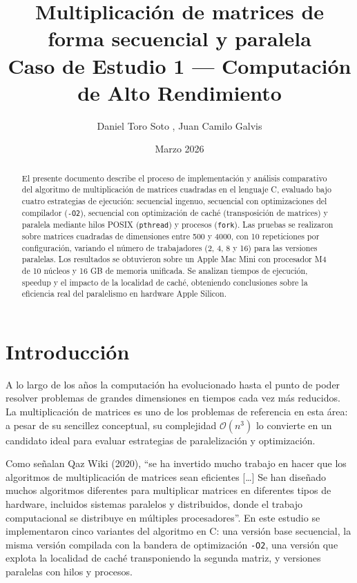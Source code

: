 \documentclass{article}
\title{Multiplicación de matrices de forma secuencial y paralela\\[0.5em]
\large Caso de Estudio 1 --- Computación de Alto Rendimiento}
\author{Daniel Toro Soto , Juan Camilo Galvis}
\date{Marzo 2026}
\begin{document}
\maketitle

\begin{abstract}
El presente documento describe el proceso de implementación y análisis comparativo del algoritmo de multiplicación de matrices cuadradas en el lenguaje C, evaluado bajo cuatro estrategias de ejecución: secuencial ingenuo, secuencial con optimizaciones del compilador (\texttt{-O2}), secuencial con optimización de caché (transposición de matrices) y paralela mediante hilos POSIX (\texttt{pthread}) y procesos (\texttt{fork}). Las pruebas se realizaron sobre matrices cuadradas de dimensiones entre 500 y 4000, con 10 repeticiones por configuración, variando el número de trabajadores (2, 4, 8 y 16) para las versiones paralelas. Los resultados se obtuvieron sobre un Apple Mac Mini con procesador M4 de 10 núcleos y 16 GB de memoria unificada. Se analizan tiempos de ejecución, speedup y el impacto de la localidad de caché, obteniendo conclusiones sobre la eficiencia real del paralelismo en hardware Apple Silicon.
\end{abstract}

\tableofcontents
\newpage

\section{Introducción}

A lo largo de los años la computación ha evolucionado hasta el punto de poder resolver problemas de grandes dimensiones en tiempos cada vez más reducidos. La multiplicación de matrices es uno de los problemas de referencia en esta área: a pesar de su sencillez conceptual, su complejidad $\mathcal{O}(n^3)$ lo convierte en un candidato ideal para evaluar estrategias de paralelización y optimización.

Como señalan Qaz Wiki (2020), ``se ha invertido mucho trabajo en hacer que los algoritmos de multiplicación de matrices sean eficientes [\ldots] Se han diseñado muchos algoritmos diferentes para multiplicar matrices en diferentes tipos de hardware, incluidos sistemas paralelos y distribuidos, donde el trabajo computacional se distribuye en múltiples procesadores''. En este estudio se implementaron cinco variantes del algoritmo en C: una versión base secuencial, la misma versión compilada con la bandera de optimización \texttt{-O2}, una versión que explota la localidad de caché transponiendo la segunda matriz, y versiones paralelas con hilos y procesos.
\end{document}
